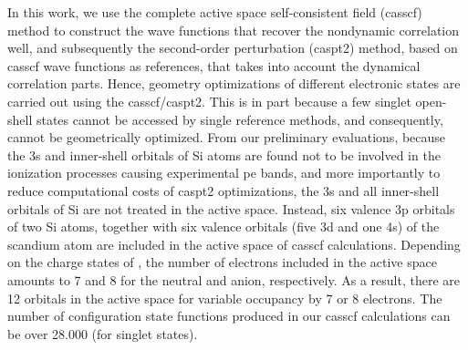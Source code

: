 \begin{refsection}
In this work, we use the complete active space self-consistent field (\acrshort{casscf}) method to construct the wave functions that recover the nondynamic correlation well, and subsequently the second-order perturbation (\acrshort{caspt2}) method, based on \acrshort{casscf} wave functions as references, that takes into account the dynamical correlation parts. Hence, geometry optimizations of different electronic states are carried out using the \acrshort{casscf}/\acrshort{caspt2}.\cite{c3:40} This is in part because a few singlet open-shell states cannot be accessed by single reference methods, and consequently, cannot be geometrically optimized. From our preliminary evaluations, because the 3s and inner-shell orbitals of Si atoms are found not to be involved in the ionization processes causing experimental \acrshort{pe} bands, and more importantly to reduce computational costs of \acrshort{caspt2} optimizations, the 3s and all inner-shell orbitals of Si are not treated in the active space. Instead, six valence 3p orbitals of two Si atoms, together with six valence orbitals (five 3d and one 4s) of the scandium atom are included in the active space of \acrshort{casscf} calculations. Depending on the charge states of , the number of electrons included in the active space amounts to 7 and 8 for the neutral and anion, respectively. As a result, there are 12 orbitals in the active space for variable occupancy by 7 or 8 electrons. The number of configuration state functions produced in our \acrshort{casscf} calculations can be over 28.000 (for singlet states).





\end{refsection}
